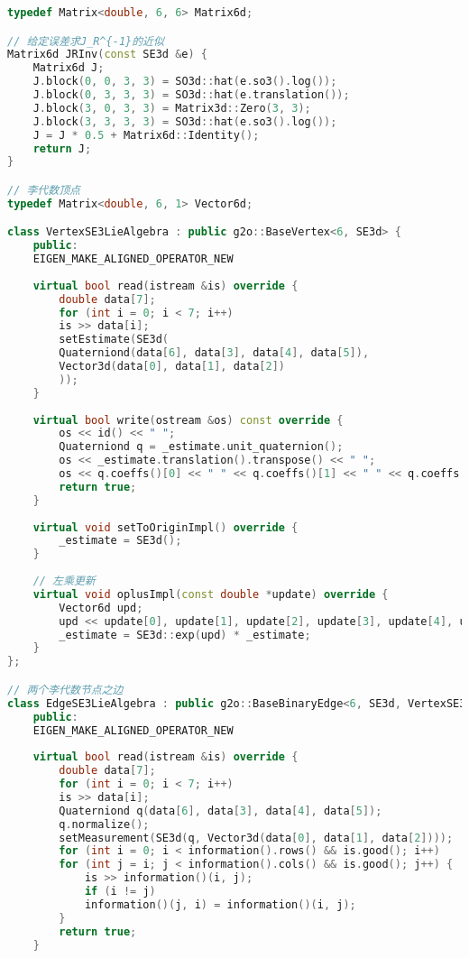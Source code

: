 \clearpage
\begin{lstlisting}[language=c++,caption=slambook2/ch10/pose\_graph\_g2o\_lie\_algebra.cpp（片段）]
typedef Matrix<double, 6, 6> Matrix6d;

// 给定误差求J_R^{-1}的近似
Matrix6d JRInv(const SE3d &e) {
    Matrix6d J;
    J.block(0, 0, 3, 3) = SO3d::hat(e.so3().log());
    J.block(0, 3, 3, 3) = SO3d::hat(e.translation());
    J.block(3, 0, 3, 3) = Matrix3d::Zero(3, 3);
    J.block(3, 3, 3, 3) = SO3d::hat(e.so3().log());
    J = J * 0.5 + Matrix6d::Identity();
    return J;
}

// 李代数顶点
typedef Matrix<double, 6, 1> Vector6d;

class VertexSE3LieAlgebra : public g2o::BaseVertex<6, SE3d> {
    public:
    EIGEN_MAKE_ALIGNED_OPERATOR_NEW
    
    virtual bool read(istream &is) override {
        double data[7];
        for (int i = 0; i < 7; i++)
        is >> data[i];
        setEstimate(SE3d(
        Quaterniond(data[6], data[3], data[4], data[5]),
        Vector3d(data[0], data[1], data[2])
        ));
    }
    
    virtual bool write(ostream &os) const override {
        os << id() << " ";
        Quaterniond q = _estimate.unit_quaternion();
        os << _estimate.translation().transpose() << " ";
        os << q.coeffs()[0] << " " << q.coeffs()[1] << " " << q.coeffs()[2] << " " << q.coeffs()[3] << endl;
        return true;
    }
    
    virtual void setToOriginImpl() override {
        _estimate = SE3d();
    }
    
    // 左乘更新
    virtual void oplusImpl(const double *update) override {
        Vector6d upd;
        upd << update[0], update[1], update[2], update[3], update[4], update[5];
        _estimate = SE3d::exp(upd) * _estimate;
    }
};

// 两个李代数节点之边
class EdgeSE3LieAlgebra : public g2o::BaseBinaryEdge<6, SE3d, VertexSE3LieAlgebra, VertexSE3LieAlgebra> {
    public:
    EIGEN_MAKE_ALIGNED_OPERATOR_NEW
    
    virtual bool read(istream &is) override {
        double data[7];
        for (int i = 0; i < 7; i++)
        is >> data[i];
        Quaterniond q(data[6], data[3], data[4], data[5]);
        q.normalize();
        setMeasurement(SE3d(q, Vector3d(data[0], data[1], data[2])));
        for (int i = 0; i < information().rows() && is.good(); i++)
        for (int j = i; j < information().cols() && is.good(); j++) {
            is >> information()(i, j);
            if (i != j)
            information()(j, i) = information()(i, j);
        }
        return true;
    }
    

\end{lstlisting}
